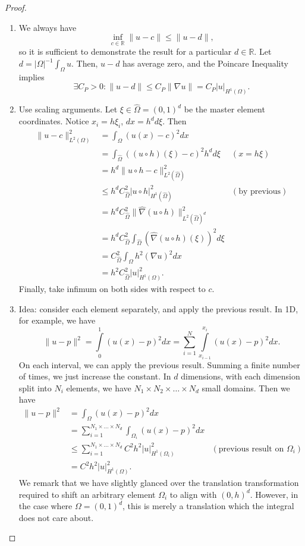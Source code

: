 \documentclass[letterpaper,twoside,11pt]{article}
\theoremstyle{mystyle}
\newcommand{\R}{{\mathbb R}}
\newcommand{\cblu}{\color{blue}}
\newcommand{\inv}{^{-1}}
\newcommand{\Hone}{H^1\left( \Omega \right)}
\begin{document}
\cblu 
\begin{proof}
  \begin{enumerate}
    \item We always have 
    \[\inf_{c\in \R} \|u-c\| \leq \| u - d \|,  \]
    so it is sufficient to demonstrate the result for a particular $d\in \R$. Let $d = |\Omega|\inv \int_\Omega u$. Then, $u-d$ has average zero, and the Poincare Inequality implies 
    \[\exists C_P>0 : \|u-d\| \leq C_P \|\nabla u\| = C_P |u|_{\Hone}.\]
    \item Use scaling arguments. Let $\xi\in \hat \Omega = \left( 0,1 \right)^d$ be the master element coordinates. Notice $x_i = h\xi_i$, $dx = h^d d\xi$. Then 
    \begin{align*}
      \|u-c\|^2_{L^2(\Omega)} &= \int_\Omega (u(x)-c)^2 dx \\[.2cm] 
      &= \int_{\hat \Omega} \left( (u\circ h)(\xi) - c \right)^2 h^d d\xi &  (x = h \xi)  \\[.2cm]
      &= h^d\|u \circ h - c \|^2_{L^2 (\hat \Omega)} \\[.2cm] 
      &\leq h^dC_{\hat\Omega}^2 |u\circ h|^2_{H^1(\hat\Omega)} & (\text{by previous})\\[.2cm] 
      &= h^dC_{\hat\Omega}^2 \|\hat \nabla (u\circ h) \|^2_{L^2(\hat \Omega)^d} \\[.2cm]
      &= h^dC_{\hat\Omega}^2 \int_{\hat\Omega} (\hat \nabla (u \circ h) (\xi))^2 d\xi \\[.2cm]
      &= C_{\hat\Omega}^2 \int_\Omega h^2 \left( \nabla u \right)^2 dx \\[.2cm]
      &= h^2 C_{\hat\Omega}^2 |u|^2_{\Hone}.
    \end{align*}
    Finally, take infimum on both sides with respect to $c$. 
    \item Idea: consider each element separately, and apply the previous result. In 1D, for example, we have
    \[\|u-p\|^2=\int\limits_0^1 (u(x)-p)^2 dx = \sum_{i = 1}^{N}\int\limits_{x_{i-1}}^{x_i} (u(x)-p)^2dx.\]
    On each interval, we can apply the previous result. Summing a finite number of times, we just increase the constant. In $d$ dimensions, with each dimension split into $N_i$ elements, we have \(N_1 \times N_2 \times \dots \times N_d \) small domains. Then we have 
    \begin{align*}
      \|u-p\|^2 &= \int_\Omega (u(x)-p)^2 dx \\[.2cm]
      &=\sum_{i = 1}^{N_1 \times \dots \times N_d} \int_{\Omega_i} (u(x)-p)^2 dx \\[.2cm]
      &\leq \sum_{i = 1}^{N_1 \times \dots \times N_d} C^2h^2 |u|^2_{H^1(\Omega_i)} & (\text{previous result on } \Omega_i)\\[.2cm]
      &= C^2 h^2 |u|^2_{H^1(\Omega)}.
    \end{align*}
    We remark that we have slightly glanced over the translation transformation required to shift an arbitrary element \(\Omega_i\) to align with \(\left( 0,h \right)^d\). However, in the case where \(\Omega = \left( 0,1 \right)^d\), this is merely a translation which the integral does not care about. 
  \end{enumerate}
\end{proof}
\end{document}
